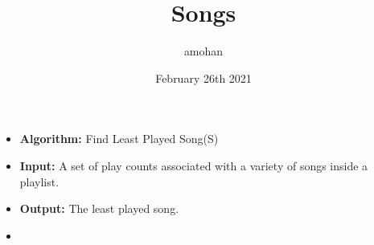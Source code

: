 \documentclass{article}
\title{Songs}
\author{amohan}
\date{February 26th 2021}
\begin{document}
\begin{itemize}
\item[]
\textbf{Algorithm:} Find Least Played Song(S)
\item[]
\textbf{Input:} A set of play counts associated with a variety of songs inside a playlist.
\item[]
\textbf{Output:} The least played song.
\item[]
\scalebox{1}{
\begin{algorithm}[H]
\begin{algorithmic}[1]

\end{algorithmic}
\label{alg:seq}
\end{algorithm}
}
\end{itemize}
\end{document}
